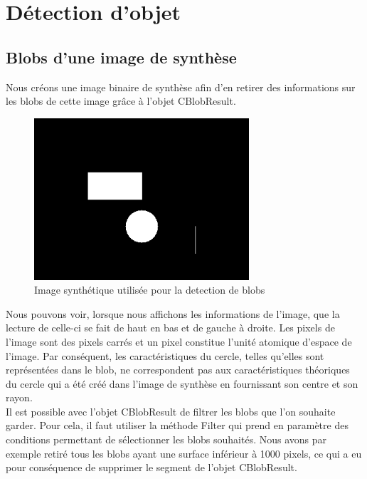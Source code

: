 \section{Détection d'objet}

\subsection{Blobs d'une image de synthèse}

Nous créons une image binaire de synthèse afin d'en retirer des informations sur les blobs de cette image
grâce à l'objet CBlobResult.

\begin{figure}[H]
      \center
      \includegraphics[width=8cm]{ressources/tp5/bin_synth.png}
      \caption{Image synthétique utilisée pour la detection de blobs}
\end{figure}

Nous pouvons voir, lorsque nous affichons les informations de l'image, que la lecture de celle-ci se fait 
de haut en bas et de gauche à droite. Les pixels de l'image sont des pixels carrés et un pixel constitue l'unité atomique d'espace de l'image.
Par conséquent, les caractéristiques du cercle, telles qu'elles sont représentées dans le blob, ne correspondent pas aux caractéristiques théoriques
du cercle qui a été créé dans l'image de synthèse en fournissant son centre et son rayon.\\

Il est possible avec l'objet CBlobResult de filtrer les blobs que l'on souhaite garder. Pour cela,
il faut utiliser la méthode Filter qui prend en paramètre des conditions permettant de sélectionner 
les blobs souhaités. Nous avons par exemple retiré tous les blobs ayant une surface inférieur à 1000 pixels,
ce qui a eu pour conséquence de supprimer le segment de l'objet CBlobResult.

